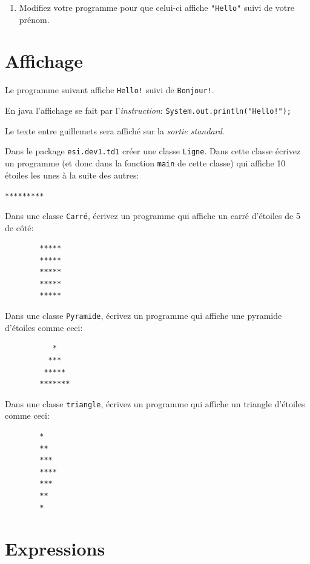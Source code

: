 \documentclass[a4paper,11pt]{article}
\begin{document}
\begin{enumerate}
		\item Modifiez votre programme pour que celui-ci affiche \texttt{"Hello"} suivi de votre prénom.

	\end{enumerate}


\section{Affichage}

	Le programme suivant affiche \texttt{Hello!} suivi de \texttt{Bonjour!}.

	En java l'affichage se fait par l'\emph{instruction}: \texttt{System.out.println("Hello!");}
	
	Le texte entre guillemets sera affiché sur la \emph{sortie standard}.

	\hspeparator


	\Exercice{}
		Dans le package \texttt{esi.dev1.td1} créer une classe \texttt{Ligne}.
		Dans cette classe écrivez un programme  (et donc dans la fonction \texttt{main} de cette classe) 
		qui affiche 10 étoiles les unes à la suite des autres:

		\texttt{*********}

	\Exercice{}
		Dans une classe \texttt{Carré}, écrivez un programme qui affiche un carré d'étoiles de 5 de côté:

		\begin{verbatim}
		*****
		*****
		*****
		*****
		*****
		\end{verbatim}

	\Exercice{}
		Dans une classe \texttt{Pyramide}, écrivez un programme qui affiche une pyramide d'étoiles comme ceci:

		\begin{verbatim}
		   *
		  ***
		 *****
		*******
		\end{verbatim}

	\Exercice{}
		Dans une classe \texttt{triangle}, écrivez un programme qui affiche un triangle d'étoiles comme ceci:

		\begin{verbatim}
		*
		**
		***
		****
		***
		**
		*
		\end{verbatim}





\section{Expressions}
\end{document}
